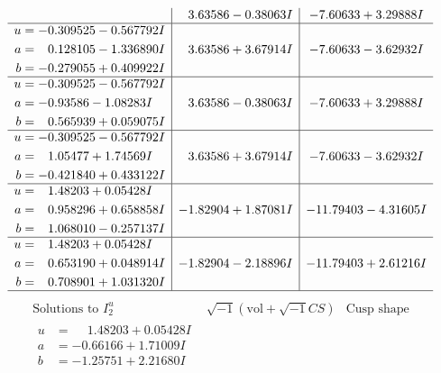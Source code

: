 \documentclass[1p]{elsarticle_modified}
\theoremstyle{definition}
\newcommand{\I}{\sqrt{-1}}
\begin{document}
$$\begin{array}{c|c|c}
 & \phantom{-}3.63586 - 0.38063 I & -7.60633 + 3.29888 I \\ \hline\begin{aligned}
u &= -0.309525 - 0.567792 I \\
a &= \phantom{-}0.128105 - 1.336890 I \\
b &= -0.279055 + 0.409922 I\end{aligned}
 & \phantom{-}3.63586 + 3.67914 I & -7.60633 - 3.62932 I \\ \hline\begin{aligned}
u &= -0.309525 - 0.567792 I \\
a &= -0.93586 - 1.08283 I \\
b &= \phantom{-}0.565939 + 0.059075 I\end{aligned}
 & \phantom{-}3.63586 - 0.38063 I & -7.60633 + 3.29888 I \\ \hline\begin{aligned}
u &= -0.309525 - 0.567792 I \\
a &= \phantom{-}1.05477 + 1.74569 I \\
b &= -0.421840 + 0.433122 I\end{aligned}
 & \phantom{-}3.63586 + 3.67914 I & -7.60633 - 3.62932 I \\ \hline\begin{aligned}
u &= \phantom{-}1.48203 + 0.05428 I \\
a &= \phantom{-}0.958296 + 0.658858 I \\
b &= \phantom{-}1.068010 - 0.257137 I\end{aligned}
 & -1.82904 + 1.87081 I & -11.79403 - 4.31605 I \\ \hline\begin{aligned}
u &= \phantom{-}1.48203 + 0.05428 I \\
a &= \phantom{-}0.653190 + 0.048914 I \\
b &= \phantom{-}0.708901 + 1.031320 I\end{aligned}
 & -1.82904 - 2.18896 I & -11.79403 + 2.61216 I\\
 \hline 
 \end{array}$$\newpage$$\begin{array}{c|c|c}  
\text{Solutions to }I^u_{2}& \I (\text{vol} + \sqrt{-1}CS) & \text{Cusp shape}\\
 \hline 
\begin{aligned}
u &= \phantom{-}1.48203 + 0.05428 I \\
a &= -0.66166 + 1.71009 I \\
b &= -1.25751 + 2.21680 I\end{aligned}

\end{array}$$
\end{document}
